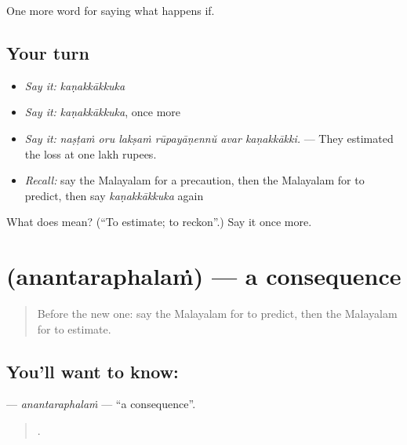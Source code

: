 \begin{grammarlens}[title={What you've built}]
One more word for saying what happens if.
\end{grammarlens}

\subsection*{Your turn}
\begin{itemize}
\raggedright
  \item \emph{Say it:} \emph{kaṇakkākkuka}
  \item \emph{Say it:} \emph{kaṇakkākkuka}, once more
  \item \emph{Say it:} \emph{naṣṭaṁ oru lakṣaṁ rūpayāṇennŭ avar kaṇakkākki.} — They estimated the loss at one lakh rupees.
  \item \emph{Recall:} say the Malayalam for a precaution, then the Malayalam for to predict, then say \emph{kaṇakkākkuka} again
\end{itemize}

\begin{tcolorbox}[breakable,colback=teal!4,colframe=teal!35!black,title={Before you move on}]
What does  mean? (\textquotedblleft{}To estimate; to reckon\textquotedblright{}.) Say it once more.
\end{tcolorbox}
\section[\texorpdfstring{\ml{അനന്തരഫലം} (anantaraphalaṁ)}{അനന്തരഫലം (anantaraphalaṁ)}]{ (anantaraphalaṁ) — a consequence}

\label{lesson:ML-C442-anantaraphalam}



\begin{quote}
Before the new one: say the Malayalam for to predict, then the Malayalam for to estimate.
\end{quote}

\subsection*{You'll want to know: }
\textbf{} — \emph{anantaraphalaṁ} — \textquotedblleft{}a consequence\textquotedblright{}.

\begin{quote}
    .
\end{quote}

